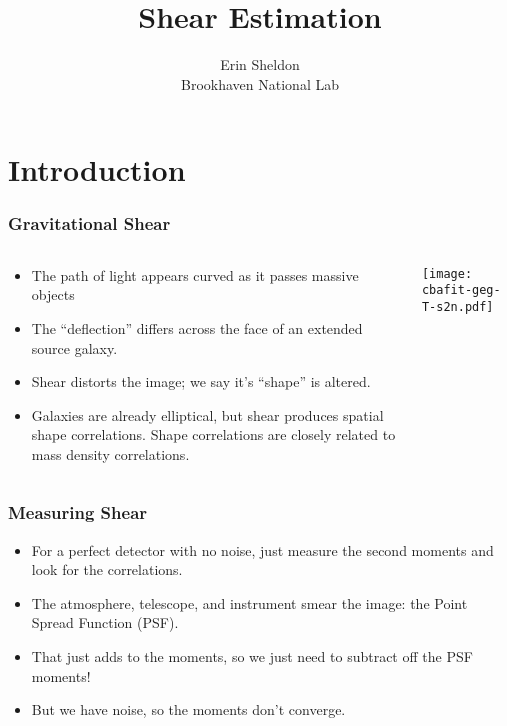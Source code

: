 \documentclass{beamer}
\title{Shear Estimation}
\author
{
    Erin Sheldon \\
    Brookhaven National Lab
}
\begin{document}
\frame{\titlepage}

\section{Introduction}


\frame
{
    \fontsize{10}{\baselineskip}

    \frametitle{Gravitational Shear}

    \begin{columns}

        \begin{column}{0.5\textwidth}

            \begin{itemize}
                \item The path of light appears curved as it passes massive objects
                \item The ``deflection'' differs across the face of an extended source galaxy.
                \item Shear distorts the image; we say it's ``shape'' is altered.
                \item Galaxies are already elliptical, but shear produces spatial shape correlations.
                    Shape correlations are closely related to mass density
                    correlations.

            \end{itemize}
        \end{column}
        \begin{column}{0.5\textwidth}
            \texttt{[image: cbafit-geg-T-s2n.pdf]}
        \end{column}
    \end{columns}
}



\frame
{
    \frametitle{Measuring Shear}

    \begin{itemize}
        \item For a perfect detector with no noise, just measure
            the second moments and look for the correlations.
        \item The atmosphere, telescope, and instrument smear
            the image: the Point Spread Function (PSF).
        \item That just adds to the moments, so we just need to
            subtract off the PSF moments!
        \item But we have noise, so the moments don't converge.
    \end{itemize}
}
\end{document}
